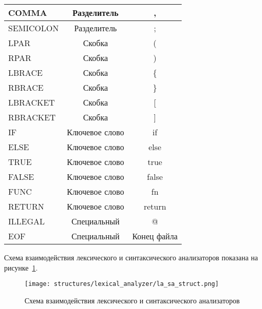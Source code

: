 \begin{table}[h!]
\begin{threeparttable}
\begin{tabularx}{\textwidth}{|X|c|c|}
            \hline
            COMMA         & Разделитель    & ,               \\
            \hline
            SEMICOLON     & Разделитель    & ;               \\
            \hline
            LPAR          & Скобка         & (               \\
            \hline
            RPAR          & Скобка         & )               \\
            \hline
            LBRACE        & Скобка         & \{              \\
            \hline
            RBRACE        & Скобка         & \}              \\
            \hline
            LBRACKET      & Скобка         & [               \\
            \hline
            RBRACKET      & Скобка         & ]               \\
            \hline
            IF            & Ключевое слово & if              \\
            \hline
            ELSE          & Ключевое слово & else            \\
            \hline
            TRUE          & Ключевое слово & true            \\
            \hline
            FALSE         & Ключевое слово & false           \\
            \hline
            FUNC          & Ключевое слово & fn              \\
            \hline
            RETURN        & Ключевое слово & return          \\
            \hline
            ILLEGAL       & Специальный    & @               \\
            \hline
            EOF           & Специальный    & Конец файла     \\
            \hline
        \end{tabularx}
    \end{threeparttable}
    \vspace{\bottompaddingoftable}
\end{table}

Схема взаимодействия лексического и синтаксического анализаторов показана на рисунке~\ref{f:la_sa_struct}.

\begin{figure}[ht]
	\centering
	\vspace{\toppaddingoffigure}
	\texttt{[image: structures/lexical\_analyzer/la\_sa\_struct.png]}
	\caption{Схема взаимодействия лексического и синтаксического анализаторов}
	\label{f:la_sa_struct}
\end{figure}

